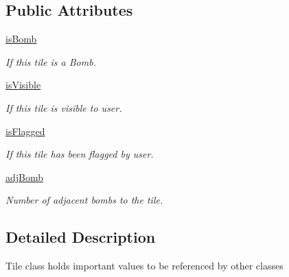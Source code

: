 \subsection*{Public Attributes}
\begin{DoxyCompactItemize}
\item 
\mbox{\label{classtile_1_1tile_a0c5e73514e10b42dfb81b4362b079f07}} 
\mbox{\hyperlink{classtile_1_1tile_a0c5e73514e10b42dfb81b4362b079f07}{is\+Bomb}}
\begin{DoxyCompactList}\small\item\em If this tile is a Bomb. \end{DoxyCompactList}\item 
\mbox{\label{classtile_1_1tile_a9cfb7110e4d0edcee61a9243bf460dc2}} 
\mbox{\hyperlink{classtile_1_1tile_a9cfb7110e4d0edcee61a9243bf460dc2}{is\+Visible}}
\begin{DoxyCompactList}\small\item\em If this tile is visible to user. \end{DoxyCompactList}\item 
\mbox{\label{classtile_1_1tile_a88352aeba615f4ed0f425c7bd7ac82b8}} 
\mbox{\hyperlink{classtile_1_1tile_a88352aeba615f4ed0f425c7bd7ac82b8}{is\+Flagged}}
\begin{DoxyCompactList}\small\item\em If this tile has been flagged by user. \end{DoxyCompactList}\item 
\mbox{\label{classtile_1_1tile_ad8524a450f8196ef6d5711ba050de1a4}} 
\mbox{\hyperlink{classtile_1_1tile_ad8524a450f8196ef6d5711ba050de1a4}{adj\+Bomb}}
\begin{DoxyCompactList}\small\item\em Number of adjacent bombs to the tile. \end{DoxyCompactList}\end{DoxyCompactItemize}


\subsection{Detailed Description}
\begin{DoxyVerb}Tile class holds important values to be referenced by other classes
\end{DoxyVerb}
 

